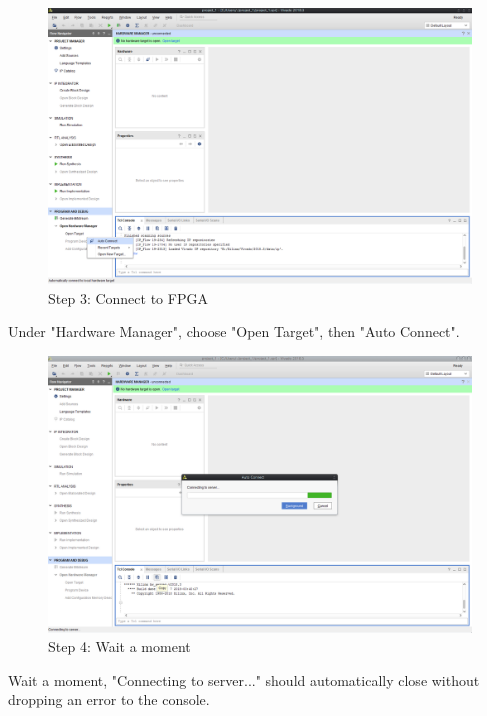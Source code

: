 \begin{figure}
  \includegraphics[width=\linewidth]{images/vivado03.png}
  \caption{Step 3: Connect to FPGA}
  \label{fig:vivado03}
\end{figure}

Under "Hardware Manager", choose "Open Target", then "Auto Connect".

\begin{figure}
  \includegraphics[width=\linewidth]{images/vivado04.png}
  \caption{Step 4: Wait a moment}
  \label{fig:vivado04}
\end{figure}

Wait a moment, "Connecting to server..."  should automatically close without dropping an error to the console.

